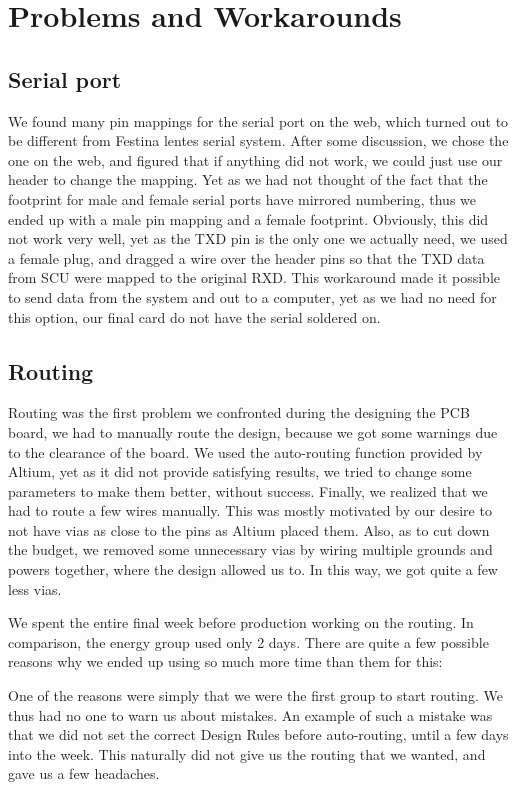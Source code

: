 \section {Problems and Workarounds}
\subsection{Serial port}
We found many pin mappings for the serial port on the web, which turned out to
be different from Festina lentes serial system. After some discussion, we chose
the one on the web, and figured that if anything did not work, we could just
use our header to change the mapping.  Yet as we had not thought of the fact
that the footprint for male and female serial ports have mirrored numbering,
thus we ended up with a male pin mapping and a female footprint.  Obviously,
this did not work very well, yet as the TXD pin is the only one we actually
need, we used a female plug, and dragged a wire over the header pins so that
the TXD data from SCU were mapped to the original RXD. This workaround made it
possible to send data from the system and out to a computer, yet as we had no
need for this option, our final card do not have the serial soldered on.

\subsection{Routing}
Routing was the first problem we confronted during the designing the \ac{PCB}
board, we had to manually route the design, because we got some warnings due to
the clearance of the board. We used the auto-routing function provided by
Altium, yet as it did not provide satisfying results, we tried to change some
parameters to make them better, without success. Finally, we realized that we
had to route a few wires manually. This was mostly motivated by our desire to
not have vias as close to the pins as Altium placed them. Also, as to cut down
the budget, we removed some unnecessary vias by wiring multiple grounds and
powers together, where the design allowed us to. In this way, we got quite a few
less vias.

We spent the entire final week before production working on the routing. In comparison, the energy group used only 2 days. There are quite a few possible reasons why we ended up using so much more time than them for this:

One of the reasons were simply that we were the first group to start routing. We thus had no one to warn us about mistakes. An example of such a mistake was that we did not set the correct Design Rules before auto-routing, until a few days into the week. This naturally did not give us the routing that we wanted, and gave us a few headaches.

